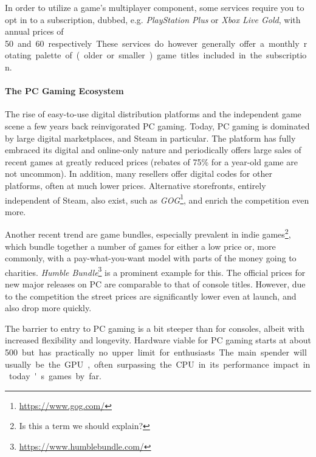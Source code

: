 In order to utilize a game's multiplayer component, some services require you to opt in to a subscription, dubbed, e.g. \textit{PlayStation Plus} or \textit{Xbox Live Gold}, with annual prices of \SI{50}[\EUR] and \SI{60}[\EUR] respectively. These services do however generally offer a monthly rotating palette of (older or smaller) game titles included in the subscription.




\paragraph{The PC Gaming Ecosystem}

The rise of easy-to-use digital distribution platforms and the independent game scene a few years back reinvigorated PC gaming. Today, PC gaming is dominated by large digital marketplaces, and Steam in particular. The platform has fully embraced its digital and online-only nature and periodically offers large sales of recent games at greatly reduced prices (rebates of 75\% for a year-old game are not uncommon). In addition, many resellers offer digital codes for other platforms, often at much lower prices. Alternative storefronts, entirely independent of Steam, also exist, such as \textit{GOG}\footnote{\url{https://www.gog.com/}}, and enrich the competition even more.

Another recent trend are game bundles, especially prevalent in indie games\footnote{Is this a term we should explain?}, which bundle together a number of games for either a low price or, more commonly, with a pay-what-you-want model with parts of the money going to charities. \textit{Humble Bundle}\footnote{\url{https://www.humblebundle.com/}} is a prominent example for this. The official prices for new major releases on PC are comparable to that of console titles. However, due to the competition the street prices are significantly lower even at launch, and also drop more quickly.

The barrier to entry to PC gaming is a bit steeper than for consoles, albeit with increased flexibility and longevity. Hardware viable for PC gaming starts at about \SI{500}[\EUR] but has practically no upper limit for enthusiasts. The main spender will usually be the \gls{GPU}, often surpassing the \acrshort{CPU} in its performance impact in today's games by far.


